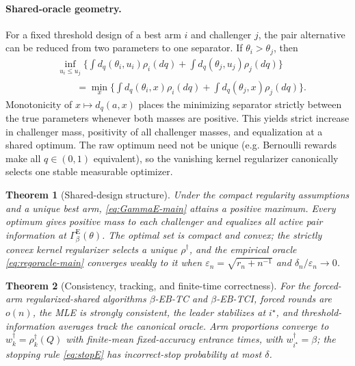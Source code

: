 \documentclass[twoside]{article}
\newtheorem{theorem}{Theorem}
\theoremstyle{definition}
\newcommand{\1}{\mathbf 1}
\newcommand{\GammaE}{\Gamma_{\beta}^{\mathrm E}}
\begin{document}
\paragraph{Shared-oracle geometry.}
For a fixed threshold design of a best arm $i$ and challenger $j$, the pair alternative can be reduced from two parameters to one separator.  If $\theta_i>\theta_j$, then
\begin{equation}
\begin{split}
&\inf_{u_i\le u_j}
\Big\{\int d_q(\theta_i,u_i)\rho_i(dq)
+\int d_q(\theta_j,u_j)\rho_j(dq)\Big\}\\
&\qquad=\min_x\Big\{\int d_q(\theta_i,x)\rho_i(dq)
+\int d_q(\theta_j,x)\rho_j(dq)\Big\}.
\end{split}
\label{eq:Escalar}
\end{equation}
Monotonicity of $x\mapsto d_q(a,x)$ places the minimizing separator
strictly between the true parameters whenever both masses are positive.  This
yields strict increase in challenger mass, positivity of all challenger masses,
and equalization at a shared optimum.  The raw optimum need not be unique
(e.g. Bernoulli rewards make all $q\in(0,1)$ equivalent), so the vanishing
kernel regularizer canonically selects one stable measurable optimizer.

\begin{theorem}[Shared-design structure]
\label{thm:Estructure}
Under the compact regularity assumptions and a unique best arm,
\eqref{eq:GammaE-main} attains a positive maximum.  Every optimum gives
positive mass to each challenger and equalizes all active pair information at
$\GammaE(\theta)$.  The optimal set is compact and convex; the strictly convex
kernel regularizer selects a unique $\rho^\dagger$, and the empirical oracle
\eqref{eq:regoracle-main} converges weakly to it when
$\varepsilon_n=\sqrt{r_n+n^{-1}}$ and $\delta_n/\varepsilon_n\to0$.
\end{theorem}

\begin{theorem}[Consistency, tracking, and finite-time correctness]
\label{thm:Ecore}
For the forced-arm regularized-shared algorithms $\beta$-EB-TC and $\beta$-EB-TCI, forced rounds are
$o(n)$, the MLE is strongly consistent, the leader stabilizes at $i^\star$,
and threshold-information averages track the canonical oracle.  Arm
proportions converge to $w_k^\dagger=\rho_k^\dagger(Q)$ with finite-mean
fixed-accuracy entrance times, with $w_{i^\star}^\dagger=\beta$; the stopping
rule \eqref{eq:stopE} has incorrect-stop probability at most $\delta$.
\end{theorem}
\end{document}
